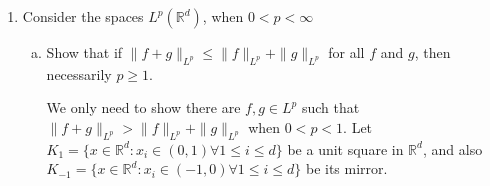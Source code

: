 \documentclass{article}
\begin{document}
\begin{enumerate}
\begin{enumerate}[(a)]
\begin{solution}
            When $p\alpha=d$, we have
            $$S_{d-1}^{-1}\|f_0\|_p^p=\int_0^1 \dfrac{dr}{r(\log(2/r))^p}.$$
            Using substitution $u=\log(2/r)$, the RHS becomes $\int_{\log 2}^\infty \dfrac{du}{u^p}$, which converges when $p>1$ and diverges when $p\leq 1$.

            When $p\alpha>d$, we want to prove $f_0\notin L^p$. We have
            \begin{align*}
                S_{d-1}^{-1} \int_{\mathbb R^d} |f_0|^p dx &= \int_0^1 \dfrac{r^{-p\alpha} r^{d-1}}{(\log (2/r))^p}dr\\
                &\geq \int_0^{1/2} \dfrac{dr}{r^{1+p\alpha -d} (\log (2/r))^p}\\
                &\geq \int_0^{1/2} \dfrac{dr}{r^{1+p\alpha-d}2^p (\log (1/r))^p}.
            \end{align*}
            The last step is because $2/r \leq 1/r^2$ whenever $0<r<1/2$. We now using $u=1/r$, RHS can be
            $$RHS \geq \int_2^\infty \dfrac{du}{2^p u^{1-p\alpha+d}(\log u)^p}.$$
            By assumption, $1-p\alpha+d<1$, we can now choose $\theta>0$ so that $1-p\alpha+d+\theta<1$, then choose $K>2$ big enough such that
            $(\log u)^p < u^\theta$ for all $u\geq K$, hence
            $$RHS \geq \int_K^\infty \dfrac{du}{2^p u^{1-p\alpha+d+\theta}} = +\infty,$$
            hence $f_0\notin L^p$.

            If the definition of $f_\infty$ changed to $$f_\infty(x) = \begin{cases}
                \abs x^{-\alpha} /\log(2\abs x) & \text{if } \abs x\geq1,\\
                0 & \text{if } \abs x< 1,
            \end{cases}$$
            then by a similar argument, we have $f_\infty\in L^p$ whenever $d<p\alpha$. When $p\alpha=d$, we can similarly prove that $f_\infty\in L^p$ iff $p>1$. Moreover,
            $f_\infty \notin L^p$ when $p\alpha<d$.
        \end{solution}
    \end{enumerate}
    \item Consider the spaces $L^p(\mathbb R^d)$, when $0<p<\infty$
    \begin{enumerate}[(a)]
        \item Show that if $\|f+g\|_{L^p}\leq \|f\|_{L^p} + \|g\|_{L^p}$ for all $f$ and $g$, then necessarily $p\geq 1$.
        
        \begin{solution}
            We only need to show there are $f,g\in L^p$ such that $\|f+g\|_{L^p}> \|f\|_{L^p} + \|g\|_{L^p}$ when $0<p<1$. Let $K_1=\{x\in \mathbb R^d: x_i\in (0,1) \forall 1\leq i\leq d\}$
            be a unit square in $\mathbb R^d$, and also $K_{-1}=\{x\in \mathbb R^d: x_i\in (-1,0) \forall 1\leq i\leq d\}$ be its mirror.


\end{solution}
\end{enumerate}
\end{enumerate}
\end{document}
